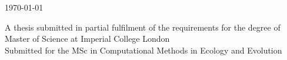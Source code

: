 \begin{titlepage}



    \vspace{1cm}
	{\large\today}\\[0.5cm] %
	\vfill

	\small {A thesis submitted in partial fulfilment of the requirements for the degree of Master of Science at Imperial College London\\
	Submitted for the MSc in Computational Methods in Ecology and Evolution}




\end{titlepage}

